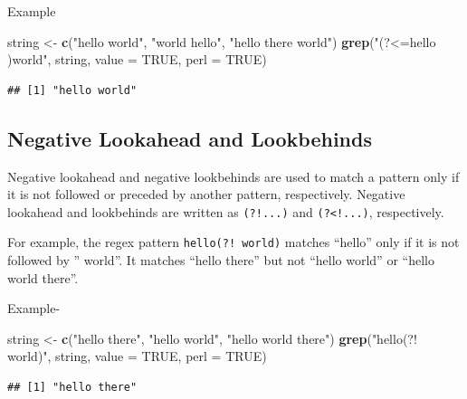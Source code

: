 \documentclass[
]{book}
\newenvironment{Shaded}{\begin{snugshade}}{\end{snugshade}}
\newcommand{\AttributeTok}[1]{\textcolor[rgb]{0.13,0.29,0.53}{#1}}
\newcommand{\ConstantTok}[1]{\textcolor[rgb]{0.56,0.35,0.01}{#1}}
\newcommand{\FunctionTok}[1]{\textcolor[rgb]{0.13,0.29,0.53}{\textbf{#1}}}
\newcommand{\NormalTok}[1]{#1}
\newcommand{\OtherTok}[1]{\textcolor[rgb]{0.56,0.35,0.01}{#1}}
\newcommand{\StringTok}[1]{\textcolor[rgb]{0.31,0.60,0.02}{#1}}
\begin{document}
Example

\begin{Shaded}
\begin{Highlighting}[]
\NormalTok{string }\OtherTok{\textless{}{-}} \FunctionTok{c}\NormalTok{(}\StringTok{"hello world"}\NormalTok{, }\StringTok{"world hello"}\NormalTok{, }\StringTok{"hello there world"}\NormalTok{)}
\FunctionTok{grep}\NormalTok{(}\StringTok{"(?\textless{}=hello )world"}\NormalTok{, string, }\AttributeTok{value =} \ConstantTok{TRUE}\NormalTok{, }\AttributeTok{perl =} \ConstantTok{TRUE}\NormalTok{)}
\end{Highlighting}
\end{Shaded}

\begin{verbatim}
## [1] "hello world"
\end{verbatim}

\hypertarget{negative-lookahead-and-lookbehinds}{%
\subsection{Negative Lookahead and Lookbehinds}\label{negative-lookahead-and-lookbehinds}}

Negative lookahead and negative lookbehinds are used to match a pattern only if it is not followed or preceded by another pattern, respectively. Negative lookahead and lookbehinds are written as \texttt{(?!...)} and \texttt{(?\textless{}!...)}, respectively.

For example, the regex pattern \texttt{hello(?!\ world)} matches ``hello'' only if it is not followed by '' world''. It matches ``hello there'' but not ``hello world'' or ``hello world there''.

Example-

\begin{Shaded}
\begin{Highlighting}[]
\NormalTok{string }\OtherTok{\textless{}{-}} \FunctionTok{c}\NormalTok{(}\StringTok{"hello there"}\NormalTok{, }\StringTok{"hello world"}\NormalTok{, }\StringTok{"hello world there"}\NormalTok{)}
\FunctionTok{grep}\NormalTok{(}\StringTok{"hello(?! world)"}\NormalTok{, string, }\AttributeTok{value =} \ConstantTok{TRUE}\NormalTok{, }\AttributeTok{perl =} \ConstantTok{TRUE}\NormalTok{)}
\end{Highlighting}
\end{Shaded}

\begin{verbatim}
## [1] "hello there"
\end{verbatim}
\end{document}
